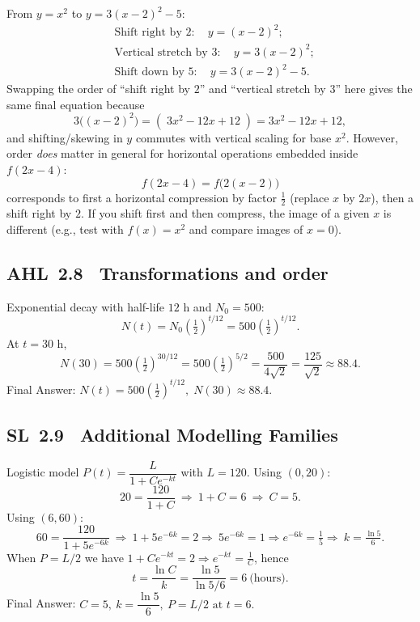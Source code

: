 \documentclass[11pt]{article}
\def\textbf#1{#1}%
\newcommand{\tocsubsection}[1]{\subsection{#1}}
\begin{document}
\begin{solution}
From $y=x^2$ to $y=3(x-2)^2-5$:
\[
\begin{aligned}
&\text{Shift right by }2:\quad y=(x-2)^2;\\
&\text{Vertical stretch by }3:\quad y=3(x-2)^2;\\
&\text{Shift down by }5:\quad y=3(x-2)^2-5.
\end{aligned}
\]
Swapping the order of “shift right by $2$” and “vertical stretch by $3$” here gives the same final equation because
\[
3\big((x-2)^2\big)=(\;3x^2-12x+12\;)=3x^2-12x+12,
\]
and shifting/skewing in $y$ commutes with vertical scaling for base $x^2$. However, order \emph{does} matter in general for horizontal operations embedded inside $f(2x-4)$:
\[
f(2x-4)=f\!\big(2(x-2)\big)
\]
corresponds to first a horizontal compression by factor $\tfrac12$ (replace $x$ by $2x$), then a shift right by $2$. If you shift first and then compress, the image of a given $x$ is different (e.g., test with $f(x)=x^2$ and compare images of $x=0$).
\end{solution}


\tocsubsection{AHL 2.8 \; Transformations and order}

\begin{solution}
Exponential decay with half-life \(12\) h and \(N_0=500\):
\[
N(t)=N_0\!\left(\tfrac12\right)^{t/12}=500\!\left(\tfrac12\right)^{t/12}.
\]
At \(t=30\) h,
\[
N(30)=500\!\left(\tfrac12\right)^{30/12}=500\!\left(\tfrac12\right)^{5/2}
=\frac{500}{4\sqrt2}=\frac{125}{\sqrt2}\approx 88.4.
\]
\textbf{Final Answer:} \(\boxed{N(t)=500\!\left(\tfrac12\right)^{t/12}},\;
\boxed{N(30)\approx 88.4}\).
\end{solution}


\tocsubsection{SL 2.9 \; Additional Modelling Families}

\begin{solution}
 Logistic model \(P(t)=\dfrac{L}{1+Ce^{-kt}}\) with \(L=120\).
Using \((0,20)\):
\[
20=\frac{120}{1+C}\ \Rightarrow\ 1+C=6\ \Rightarrow\ \boxed{C=5}.
\]
Using \((6,60)\):
\[
60=\frac{120}{1+5e^{-6k}}\ \Rightarrow\ 1+5e^{-6k}=2
\Rightarrow\ 5e^{-6k}=1 \Rightarrow e^{-6k}=\tfrac15
\Rightarrow\ \boxed{k=\tfrac{\ln 5}{6}}.
\]
When \(P=L/2\) we have \(1+Ce^{-kt}=2 \Rightarrow e^{-kt}=\tfrac1C\), hence
\[
t=\frac{\ln C}{k}=\frac{\ln 5}{\ln 5/6}= \boxed{6\ \text{(hours)}}.
\]
\textbf{Final Answer:} \(\boxed{C=5,\ k=\dfrac{\ln 5}{6}},\ P=L/2 \text{ at } \boxed{t=6}.\)
\end{solution}
\end{document}
